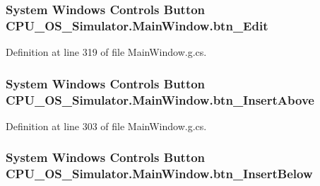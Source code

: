 \subsubsection[{btn\+\_\+\+Edit}]{\setlength{\rightskip}{0pt plus 5cm}System Windows Controls Button C\+P\+U\+\_\+\+O\+S\+\_\+\+Simulator.\+Main\+Window.\+btn\+\_\+\+Edit\hspace{0.3cm}{\ttfamily [package]}}\label{class_c_p_u___o_s___simulator_1_1_main_window_ae07013ea273fb1e9f38fd1dd83144371}


Definition at line 319 of file Main\+Window.\+g.\+cs.

\hypertarget{class_c_p_u___o_s___simulator_1_1_main_window_a23c681375b103d2294ac79c51f1fb406}{}
\subsubsection[{btn\+\_\+\+Insert\+Above}]{\setlength{\rightskip}{0pt plus 5cm}System Windows Controls Button C\+P\+U\+\_\+\+O\+S\+\_\+\+Simulator.\+Main\+Window.\+btn\+\_\+\+Insert\+Above\hspace{0.3cm}{\ttfamily [package]}}\label{class_c_p_u___o_s___simulator_1_1_main_window_a23c681375b103d2294ac79c51f1fb406}


Definition at line 303 of file Main\+Window.\+g.\+cs.

\hypertarget{class_c_p_u___o_s___simulator_1_1_main_window_a7c6c417d0bd3af11e77f86cf2cfb03fe}{}
\subsubsection[{btn\+\_\+\+Insert\+Below}]{\setlength{\rightskip}{0pt plus 5cm}System Windows Controls Button C\+P\+U\+\_\+\+O\+S\+\_\+\+Simulator.\+Main\+Window.\+btn\+\_\+\+Insert\+Below\hspace{0.3cm}{\ttfamily [package]}}\label{class_c_p_u___o_s___simulator_1_1_main_window_a7c6c417d0bd3af11e77f86cf2cfb03fe}



